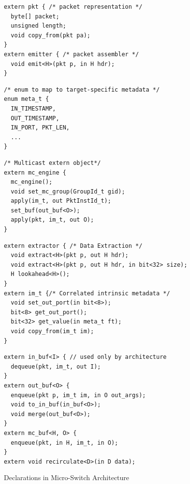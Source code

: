 \documentclass[letterpaper,twocolumn,10pt]{article}
\begin{document}


\begin{figure}
\begin{minipage}[t]{.38\textwidth}
\begin{lstlisting}[frame=none]
extern pkt { /* packet representation */
  byte[] packet; 
  unsigned length;
  void copy_from(pkt pa);
}
extern emitter { /* packet assembler */
  void emit<H>(pkt p, in H hdr);
}
\end{lstlisting}
\end{minipage}\vline
\hfill
\begin{minipage}[t]{.24\textwidth}
\begin{lstlisting}[frame=none]
/* enum to map to target-specific metadata */
enum meta_t {
  IN_TIMESTAMP,
  OUT_TIMESTAMP,
  IN_PORT, PKT_LEN,
  ...
}
\end{lstlisting}
\end{minipage}\vline
\hfill\begin{minipage}[t]{.35\textwidth}
\begin{lstlisting}[frame=none]
/* Multicast extern object*/
extern mc_engine {
  mc_engine();
  void set_mc_group(GroupId_t gid);
  apply(im_t, out PktInstId_t);
  set_buf(out_buf<O>);
  apply(pkt, im_t, out O);  
}
\end{lstlisting}
\end{minipage}
\begin{minipage}[t]{0.47\textwidth}
\begin{lstlisting}[frame=none]
extern extractor { /* Data Extraction */
  void extract<H>(pkt p, out H hdr);
  void extract<H>(pkt p, out H hdr, in bit<32> size);
  H lookahead<H>();
}
extern im_t {/* Correlated intrinsic metadata */
  void set_out_port(in bit<8>);
  bit<8> get_out_port();
  bit<32> get_value(in meta_t ft);
  void copy_from(im_t im);
}
\end{lstlisting}
\end{minipage}\vline
\hfill\noindent\begin{minipage}[t]{0.52\textwidth}
\begin{lstlisting}[frame=none]
extern in_buf<I> { // used only by architecture
  dequeue(pkt, im_t, out I);
}
extern out_buf<O> {
  enqueue(pkt p, im_t im, in O out_args);
  void to_in_buf(in_buf<O>);
  void merge(out_buf<O>);
}
extern mc_buf<H, O> {
  enqueue(pkt, in H, im_t, in O);
}
extern void recirculate<D>(in D data);
\end{lstlisting}
\end{minipage}
\caption{Declarations in Micro-Switch Architecture}
\label{fig:micro-switch-architecture}
\end{figure}
\end{document}
